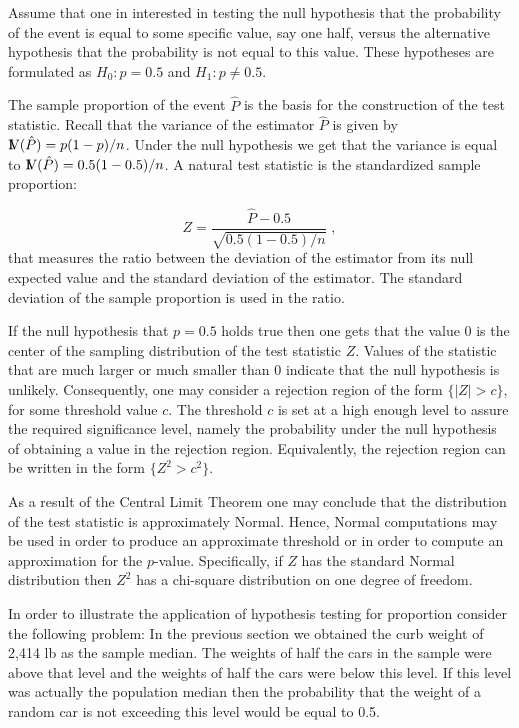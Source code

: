 \documentclass[]{krantz}
\newcommand{\Var}{{\rm I\kern-.3em V}}
\theoremstyle{definition}
\theoremstyle{definition}
\theoremstyle{definition}
\theoremstyle{remark}
\begin{document}
Assume that one in interested in testing the null hypothesis that the
probability of the event is equal to some specific value, say one half,
versus the alternative hypothesis that the probability is not equal to
this value. These hypotheses are formulated as \(H_0:p = 0.5\) and
\(H_1:p\not = 0.5\).

The sample proportion of the event \(\hat P\) is the basis for the
construction of the test statistic. Recall that the variance of the
estimator \(\hat P\) is given by \(\Var(\hat P) = p(1-p)/n\). Under the
null hypothesis we get that the variance is equal to
\(\Var(\hat P) = 0.5(1-0.5)/n\). A natural test statistic is the
standardized sample proportion:

\[Z = \frac{\hat P - 0.5}{\sqrt{0.5 (1-0.5)/n}}\;,\] that measures the
ratio between the deviation of the estimator from its null expected
value and the standard deviation of the estimator. The standard
deviation of the sample proportion is used in the ratio.

If the null hypothesis that \(p=0.5\) holds true then one gets that the
value 0 is the center of the sampling distribution of the test statistic
\(Z\). Values of the statistic that are much larger or much smaller than
0 indicate that the null hypothesis is unlikely. Consequently, one may
consider a rejection region of the form \(\{|Z| > c\}\), for some
threshold value \(c\). The threshold \(c\) is set at a high enough level
to assure the required significance level, namely the probability under
the null hypothesis of obtaining a value in the rejection region.
Equivalently, the rejection region can be written in the form
\(\{Z^2 > c^2\}\).

As a result of the Central Limit Theorem one may conclude that the
distribution of the test statistic is approximately Normal. Hence,
Normal computations may be used in order to produce an approximate
threshold or in order to compute an approximation for the \(p\)-value.
Specifically, if \(Z\) has the standard Normal distribution then \(Z^2\)
has a chi-square distribution on one degree of freedom.

In order to illustrate the application of hypothesis testing for
proportion consider the following problem: In the previous section we
obtained the curb weight of 2,414 lb as the sample median. The weights
of half the cars in the sample were above that level and the weights of
half the cars were below this level. If this level was actually the
population median then the probability that the weight of a random car
is not exceeding this level would be equal to 0.5.
\end{document}
